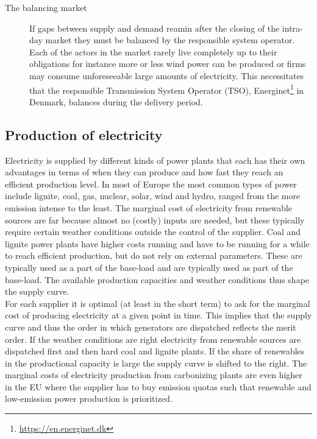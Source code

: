\begin{description}
    \item [The balancing market]
    If gaps between supply and demand reamin after the closing of the intra-day market they must be balanced by the responsible system operator. Each of the actors in the market rarely live completely up to their obligations for instance more or less wind power can be produced or firms may consume unforeseeable large amounts of electricity. This necessitates that the responsible Transmission System Operator (TSO), Energinet\footnote{\url{https://en.energinet.dk}} in Denmark, balances during the delivery period. %


\end{description}


\subsection{Production of electricity}
Electricity is supplied by different kinds of power plants that each has their own advantages in terms of when they can produce and how fast they reach an efficient production level. In most of Europe the most common types of power include lignite, coal, gas, nuclear, solar, wind and hydro, ranged from the more emission intense to the least. The marginal cost of electricity from renewable sources are far because almost no (costly) inputs are needed, but these typically require certain weather conditions outside the control of the supplier. Coal and lignite power plants have higher costs running and have to be running for a while to reach efficient production, but do not rely on external parameters. These are typically used as a part of the base-load  and are typically used as part of the base-load. The available production capacities and weather conditions thus shape the supply curve. \smallskip \\

For each supplier it is optimal (at least in the short term) to ask for the marginal cost of producing electricity at a given point in time. This implies that the supply curve and thus the order in which generators are dispatched reflects the merit order. If the weather conditions are right electricity from renewable sources are dispatched first and then hard coal and lignite plants. If the share of renewables in the productional capacity is large the supply curve is shifted to the right. The marginal costs of electricity production from carbonizing plants are even higher in the EU where the supplier has to buy emission quotas such that renewable and low-emission power production is prioritized. \smallskip \\


